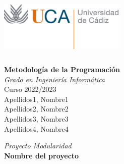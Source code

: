 

\begin{titlepage}
  
  \begin{minipage}{14cm}
    \includegraphics[width=6cm,height=3cm]{uca}\\[0.8cm]

    \center
  
    {\Huge\bfseries Metodología de la Programación}\\[1\baselineskip]
    {\huge\textit{Grado en Ingeniería Informática}}\\[1\baselineskip]
    {\large Curso 2022/2023}\\[2\baselineskip]
    
    {\Large {Apellidos1, Nombre1}}\\[0.3cm]
    {\Large {Apellidos2, Nombre2}}\\[0.3cm]
    {\Large {Apellidos3, Nombre3}}\\[0.3cm]
    {\Large {Apellidos4, Nombre4}}\\[0.3cm]
    
    \vspace{0.3\textheight}
    
    {\Large\textit{Proyecto Modularidad}}\\
    {\Large\textbf{Nombre del proyecto}}\\
    
  \end{minipage}
 
\end{titlepage}